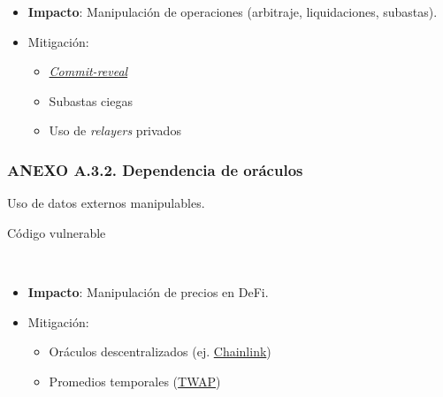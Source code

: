 \begin{itemize}
\tightlist
\item
  \textbf{Impacto}: Manipulación de operaciones (arbitraje,
  liquidaciones, subastas).
\item
  Mitigación:

  \begin{itemize}
  \tightlist
  \item
    \href{https://medium.com/coinmonks/commit-reveal-scheme-in-solidity-c06eba4091bb}{\emph{Commit-reveal}}
  \item
    Subastas ciegas
  \item
    Uso de \emph{relayers} privados
  \end{itemize}
\end{itemize}

\subsubsection{ANEXO A.3.2. Dependencia de
oráculos}\label{anexo-a.3.2.-dependencia-de-oruxe1culos}

Uso de datos externos manipulables.

Código vulnerable

\begin{Shaded}
\begin{Highlighting}[]
 \NormalTok{() }

    \NormalTok{()}\OperatorTok{;}

\NormalTok{\}}
\end{Highlighting}
\end{Shaded}

\begin{itemize}
\tightlist
\item
  \textbf{Impacto}: Manipulación de precios en DeFi.
\item
  Mitigación:

  \begin{itemize}
  \tightlist
  \item
    Oráculos descentralizados (ej.
    \href{https://chain.link/}{Chainlink})
  \item
    Promedios temporales
    (\href{https://www.binance.com/es-MX/support/faq/detail/80655cc54d8a4b2bb8ea097001844fd1}{TWAP})
  \end{itemize}
\end{itemize}

